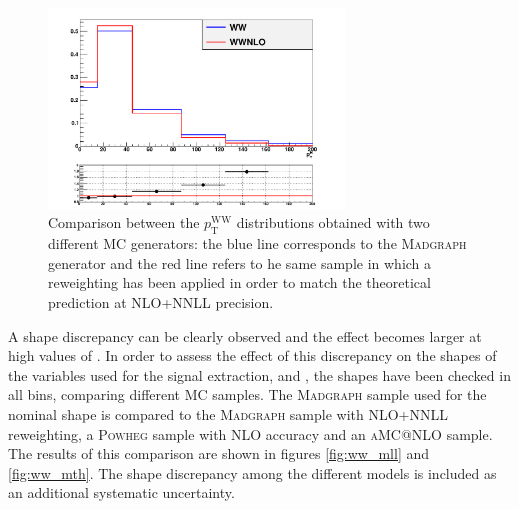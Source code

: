 \begin{figure}[b]
\centering
\includegraphics[width=0.7\textwidth]{images/WWnlo/WW_WWnlo.pdf}
\caption{Comparison between the $p_\mathrm{T}^\mathrm{WW}$ distributions obtained with two different MC generators: the blue line corresponds to the \textsc{Madgraph} generator and the red line refers to he same sample in which a reweighting has been applied in order to match the theoretical prediction at NLO+NNLL precision. }\label{fig:ww_wwnlo}
\end{figure}

A shape discrepancy can be clearly observed and the effect becomes larger at high values of \pth.
In order to assess the effect of this discrepancy on the shapes of the variables used for the signal extraction, \mll and \mt, the shapes have been checked in all \pth bins, comparing different MC samples. The \textsc{Madgraph} sample used for the nominal shape is compared to the \textsc{Madgraph} sample with NLO+NNLL  reweighting, a \textsc{Powheg} sample with NLO accuracy and an \textsc{aMC@NLO} sample.
The results of this comparison are shown in figures \ref{fig:ww_mll} and \ref{fig:ww_mth}. The shape discrepancy among the different models is included as an additional systematic uncertainty.

